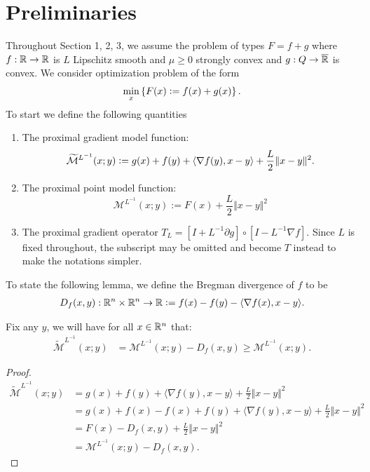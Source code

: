 \documentclass[12pt]{article}
\begin{document}
\section{Preliminaries}
    Throughout Section 1, 2, 3, we assume the problem of types $F = f + g$ where $f: \mathbb R \rightarrow \mathbb R$ is $L$ Lipschitz smooth and $\mu \ge 0$ strongly convex and $g: Q \rightarrow \overline {\mathbb R}$ is convex. 
    We consider optimization problem of the form
    \begin{align*}
        \min_x \left\lbrace
            F(x) \vcentcolon= f(x) + g(x)
        \right\rbrace. 
    \end{align*}
    To start we define the following quantities
    \begin{enumerate}
        \item The proximal gradient model function: 
        $$
            \widetilde{\mathcal M}^{L^{-1}}
            (x; y) \vcentcolon=
            g(x) + f(y) + \langle \nabla f(y), x - y\rangle 
            + \frac{L}{2}\Vert x - y\Vert^2. 
        $$
        \item The proximal point model function: 
        $$
            \mathcal M^{L^{-1}}(x; y) := F(x) + \frac{L}{2}\Vert x - y\Vert^2
        $$
        \item The proximal gradient operator $T_L = [I + L^{-1}\partial g]\circ [I - L^{-1}\nabla f]$. Since $L$ is fixed throughout, the subscript may be omitted and become $T$ instead to make the notations simpler. 
    \end{enumerate}
    To state the following lemma, we define the Bregman divergence of $f$ to be 
    \begin{align*}
        D_f(x, y): \mathbb R^n \times \mathbb R^n \rightarrow \mathbb R 
        \vcentcolon= f(x) - f(y) - \langle \nabla f(x), x - y\rangle. 
    \end{align*}
    
    \begin{lemma} 
        Fix any $y$, we will have for all $x \in \mathbb R^n$ that: 
        \begin{align*}
            \widetilde{\mathcal M}^{L^{-1}}(x; y)
            &= 
            \mathcal M^{L^{-1}}(x; y)- D_f(x, y) \ge \mathcal M^{L^{-1}}(x; y). 
        \end{align*}
    \end{lemma}
    \begin{proof}
        \begin{align*}
            \widetilde{\mathcal M}^{L^{-1}}(x; y) 
            &= 
            g(x) + f(y) + \langle \nabla f(y), x - y\rangle + \frac{L}{2}\Vert x - y\Vert^2
            \\
            &= 
            g(x) + f(x) - f(x) + f(y) 
            + \langle \nabla f(y), x - y\rangle + \frac{L}{2}\Vert x - y\Vert^2
            \\
            &= 
            F(x) - D_f(x, y) + \frac{L}{2}\Vert x - y\Vert^2 
            \\
            &= \mathcal M^{L^{-1}}(x; y) - D_f(x, y). 
        \end{align*}
    \end{proof}
    
\end{document}
